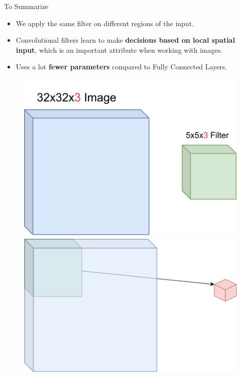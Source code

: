 \documentclass[default, aspectratio=169]{beamer}
\begin{document}
	\begin{frame}{To Summarize}
		\normalsize
		\begin{itemize}
			\item We apply the same filter on different regions of the input.
			\item Convolutional filters learn to make \textbf{decisions based on local spatial input}, which is an important attribute when working with images.
			\item Uses a lot \textbf{fewer parameters} compared to Fully Connected Layers.
		\end{itemize}
		\begin{figure}
			\includegraphics[keepaspectratio, scale=0.25]{pic/CNN2.png}
			\hspace{3cm}  %
			\includegraphics[keepaspectratio, scale=0.25]{pic/kernel2.png}
		\end{figure}
		
	\end{frame}
	
\end{document}
